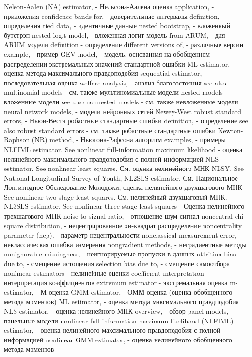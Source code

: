 Nelson-Aalen (NA) estimator, - Нельсона-Аалена оценка
application, - приложения
confidence bands for, - доверительные интервалы
definition, - определения
tied data, - идентичные данные
nested bootstrap, - вложенный бутстрэп
nested logit model, - вложенная логит-модель
from ARUM, - для ARUM модели
definition - определение
different versions of, - различные версии
example, - пример
GEV model, - модель, основанная на обобщенном распределении экстремальных значений стандартной ошибки
ML estimator, - оценка метода максимального правдоподобия
sequential estimator, - последовательная оценка
welfare analysis, - анализ благосостояния
see also multinomial models  - см. также мультиномиальные модели
nested models - вложенные модели
see also nonnested models - см. также невложенные модели
neural network models, - модели нейронных сетей
Newey-West robust standard errors, - Ньюи-Веста робастные стандартные ошибки
definition, - определение
see also robust standard errors - см. также робастные стандартные ошибки
Newton-Raphson (NR) method, - Ньютона-Рафсона алгоритм
examples, - примеры
NLFIML estimator. See nonlinear full-information maximum likelihood - оценка нелинейного максимального правдоподобия с полной информацией
NLS estimator. See nonlinear least squares. См. оценка нелинейного МНК
NLSY. See National Longitudinal Survey of Youth, NL2SLS estimator. См. Национальное Лонгитюдное Обследование Молодежи, оценка нелинейного двухшагового МНК  
See nonlinear two-stage least squares. См. нелинейный двухшаговый МНК.
NL3SLS estimator. See nonlinear three-stage least squares - Оценка нелинейного трехшагового МНК
noise-to-signal ratio, - отношение шум-сигнал
noncentral chi-square distribution, - нецентрированное хи-квадрат распределение
noncentrality parameter (ncp), - параметр нецентральности
nonclassical measurement error, - неклассическая ошибка измерения
nongradient methods, - неградиентные методы
nonignorable missingness, - неигнорируемые пропуски в данных
attrition bias due to, - смещение истощения
selection bias due to, - смещение самоотбора
nonlinear estimators - нелинейные оценки
coefficient interpretation, - интерпретация коэффициентов
extremum estimator - экстремальная оценка
m-estimator, - М-оценка
GMM estimator, - ОММ оценка (оценка обобщенного метода моментов)
ML estimator, - оценка метода максимального правдподобия
NLS estimator, - оценка нелинейного МНК
overview, - обзор
panel models, - панельные модели
nonlinear full-information maximum likelihood (NLFIML) estimator, - оценка нелинейного максимального правдоподобия с полной информацией
nonlinear GMM estimator, - оценка нелинейного обобщенного метода моментов
